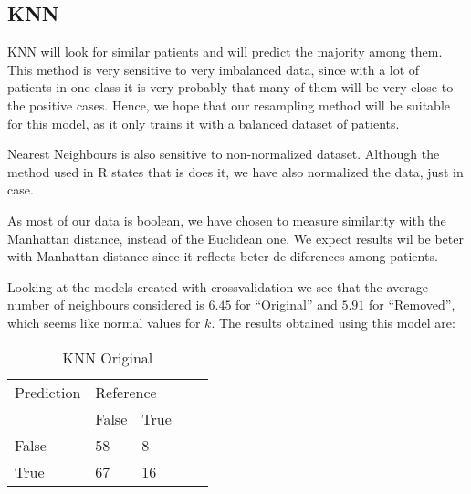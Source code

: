 \subsection{KNN}

KNN will look for similar patients and will predict the majority among them. This method is very sensitive to very imbalanced data, since with a lot of patients in one class it is very probably that many of them will be very close to the positive cases. Hence, we hope that our resampling method will be suitable for this model, as it only trains it with a balanced dataset of patients.

Nearest Neighbours is also sensitive to non-normalized dataset. Although the method used in R states that is does it, we have also normalized the data, just in case.

As most of our data is boolean, we have chosen to measure similarity with the Manhattan distance, instead of the Euclidean one. We expect results wil be beter with Manhattan distance since it reflects beter de diferences among patients.


Looking at the models created with crossvalidation we see that the average number of neighbours considered is \(6.45\) for ``Original'' and \(5.91\) for ``Removed'', which seems like normal values for \(k\). The results obtained using this model are:

\begin{table}[!htbp]
\centering
\caption{KNN Original}
\vspace{0.1cm}
\label{knn-orig}
\begin{tabular}{|l|ll|ll}
\cline{1-3}
Prediction & \multicolumn{2}{l|}{Reference} &  &  \\
           & False          & True          &  &  \\ \cline{2-3}
False      & 58              & 8             &  &  \\
True       & 67              & 16             &  &  \\ \cline{1-3}
\end{tabular}
\end{table}


